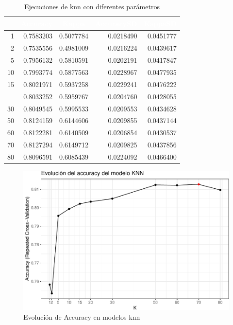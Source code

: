 \begin{table}[!h]
	
	\caption{\label{tab:knn_corridas_parametros} Ejecuciones de knn con diferentes parámetros}
	\centering
	\begin{tabular}[t]{rrrrr}
		\toprule
		\rowcolor{black}  \multicolumn{1}{c}{\textcolor{white}{\textbf{k}}} & \multicolumn{1}{c}{\textcolor{white}{\textbf{Accuracy}}} & \multicolumn{1}{c}{\textcolor{white}{\textbf{Kappa}}} & \multicolumn{1}{c}{\textcolor{white}{\textbf{AccuracySD}}} & \multicolumn{1}{c}{\textcolor{white}{\textbf{KappaSD}}}\\
		\midrule
		\rowcolor{gray!6}  1 & 0.7583203 & 0.5077784 & 0.0218490 & 0.0451777\\
		2 & 0.7535556 & 0.4981009 & 0.0216224 & 0.0439617\\
		\rowcolor{gray!6}  5 & 0.7956132 & 0.5810591 & 0.0202191 & 0.0417847\\
		10 & 0.7993774 & 0.5877563 & 0.0228967 & 0.0477935\\
		\rowcolor{gray!6}  15 & 0.8021971 & 0.5937258 & 0.0229241 & 0.0476222\\
		\addlinespace
		20 & 0.8033252 & 0.5959767 & 0.0204760 & 0.0428055\\
		\rowcolor{gray!6}  30 & 0.8049545 & 0.5995533 & 0.0209553 & 0.0434628\\
		50 & 0.8124159 & 0.6144606 & 0.0209855 & 0.0437144\\
		\rowcolor{gray!6}  60 & 0.8122281 & 0.6140509 & 0.0206854 & 0.0430537\\
		70 & 0.8127294 & 0.6149712 & 0.0209825 & 0.0437856\\
		\addlinespace
		\rowcolor{gray!6}  80 & 0.8096591 & 0.6085439 & 0.0224092 & 0.0466400\\
		\bottomrule
	\end{tabular}
\end{table}

\begin{figure}[!htb]
	\centering
	\includegraphics{imagenes/modelos_varios/unnamed-chunk-13-1.pdf}
	\caption{Evolución de Accuracy en modelos knn}
	\label{fig:knn_k_evolucion_accuracy}
\end{figure}


